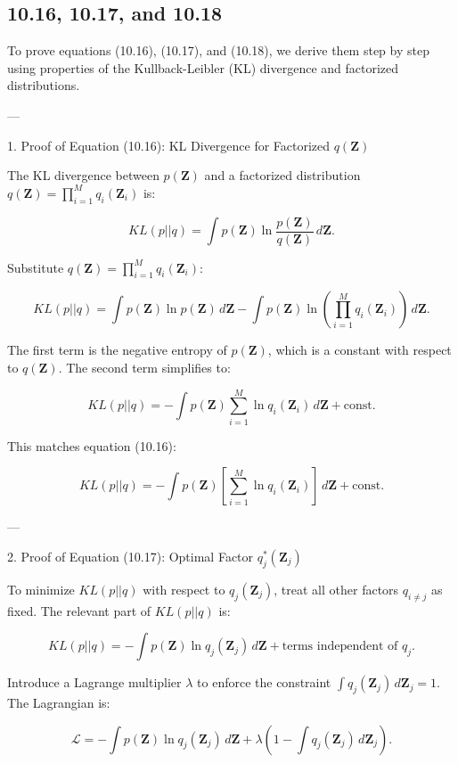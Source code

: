 \documentclass{article}
\begin{document}
\subsection{10.16, 10.17, and 10.18}
To prove equations (10.16), (10.17), and (10.18), we derive them step by step using properties of the Kullback-Leibler (KL) divergence and factorized distributions.

---

 1. Proof of Equation (10.16): KL Divergence for Factorized \( q(\mathbf{Z}) \)

The KL divergence between \( p(\mathbf{Z}) \) and a factorized distribution \( q(\mathbf{Z}) = \prod_{i=1}^M q_i(\mathbf{Z}_i) \) is:

\[
KL(p||q) = \int p(\mathbf{Z}) \ln \frac{p(\mathbf{Z})}{q(\mathbf{Z})} \, d\mathbf{Z}.
\]

Substitute \( q(\mathbf{Z}) = \prod_{i=1}^M q_i(\mathbf{Z}_i) \):

\[
KL(p||q) = \int p(\mathbf{Z}) \ln p(\mathbf{Z}) \, d\mathbf{Z} - \int p(\mathbf{Z}) \ln \left( \prod_{i=1}^M q_i(\mathbf{Z}_i) \right) \, d\mathbf{Z}.
\]

The first term is the negative entropy of \( p(\mathbf{Z}) \), which is a constant with respect to \( q(\mathbf{Z}) \). The second term simplifies to:

\[
KL(p||q) = -\int p(\mathbf{Z}) \sum_{i=1}^M \ln q_i(\mathbf{Z}_i) \, d\mathbf{Z} + \text{const}.
\]

This matches equation (10.16):

\[
KL(p||q) = -\int p(\mathbf{Z}) \left[ \sum_{i=1}^M \ln q_i(\mathbf{Z}_i) \right] \, d\mathbf{Z} + \text{const}.
\]

---

 2. Proof of Equation (10.17): Optimal Factor \( q_j^*(\mathbf{Z}_j) \)

To minimize \( KL(p||q) \) with respect to \( q_j(\mathbf{Z}_j) \), treat all other factors \( q_{i \neq j} \) as fixed. The relevant part of \( KL(p||q) \) is:

\[
KL(p||q) = -\int p(\mathbf{Z}) \ln q_j(\mathbf{Z}_j) \, d\mathbf{Z} + \text{terms independent of } q_j.
\]

Introduce a Lagrange multiplier \( \lambda \) to enforce the constraint \( \int q_j(\mathbf{Z}_j) \, d\mathbf{Z}_j = 1 \). The Lagrangian is:

\[
\mathcal{L} = -\int p(\mathbf{Z}) \ln q_j(\mathbf{Z}_j) \, d\mathbf{Z} + \lambda \left( 1 - \int q_j(\mathbf{Z}_j) \, d\mathbf{Z}_j \right).
\]
\end{document}

